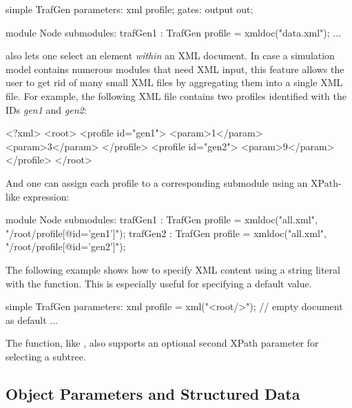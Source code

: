 \begin{ned}
simple TrafGen {
    parameters:
        xml profile;
    gates:
        output out;
}

module Node {
    submodules:
        trafGen1 : TrafGen {
            profile = xmldoc("data.xml");
        }
        ...
}
\end{ned}

 also lets one select an element \textit{within} an XML
document. In case a simulation model contains numerous modules that need XML
input, this feature allows the user to get rid of many small XML files by
aggregating them into a single XML file. For example, the following XML file
contains two profiles identified with the IDs \textit{gen1} and \textit{gen2}:

\begin{xml}
<?xml>
<root>
    <profile id="gen1">
          <param>1</param>
          <param>3</param>
    </profile>
    <profile id="gen2">
          <param>9</param>
    </profile>
</root>
\end{xml}

And one can assign each profile to a corresponding submodule using an XPath-like expression:

\begin{ned}
module Node {
    submodules:
        trafGen1 : TrafGen {
            profile = xmldoc("all.xml", "/root/profile[@id='gen1']");
        }
        trafGen2 : TrafGen {
            profile = xmldoc("all.xml", "/root/profile[@id='gen2']");
        }
}
\end{ned}

The following example shows how to specify XML content using a string literal
with the  function. This is especially useful for specifying a
default value.

\begin{ned}
simple TrafGen {
    parameters:
        xml profile = xml("<root/>"); // empty document as default
        ...
}
\end{ned}

The  function, like , also supports an
optional second XPath parameter for selecting a subtree.



\subsection{Object Parameters and Structured Data}
\label{sec:ned-lang:object-parameters}


